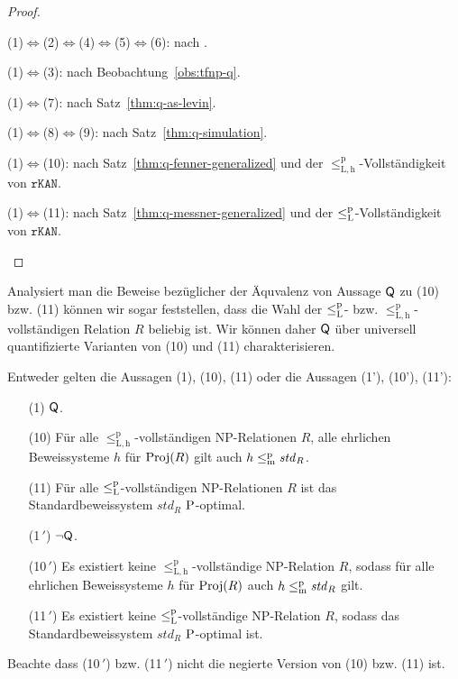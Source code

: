 \begin{proof}
\begin{prooflist}[nosep,label={\arabic*.},labelsep=3pt]
\item (1)$\iff$(2)$\iff$(4)$\iff$(5)$\iff$(6): nach \textcite[Thm.~2]{fenner_inverting_2003}. 

\item (1)$\iff$(3): nach Beobachtung~\ref{obs:tfnp-q}.

\item (1)$\iff$(7): nach Satz~\ref{thm:q-as-levin}.

\item (1)$\iff$(8)$\iff$(9): nach Satz~\ref{thm:q-simulation}.

\item (1)$\iff$(10): nach Satz~\ref{thm:q-fenner-generalized} und der $\leq_\mathrm{L,h}^\mathrm p$-Vollständigkeit von $\mathtt{rKAN}$.

\item (1)$\iff$(11): nach Satz~\ref{thm:q-messner-generalized} und der $\leqlp$-Vollständigkeit von $\mathtt{rKAN}$.
\end{prooflist}
\end{proof}

Analysiert man die Beweise bezüglicher der Äquvalenz von Aussage $\hQ$ zu (10) bzw. (11) können wir sogar feststellen, dass die Wahl der $\leqlp$- bzw. $\leq_\mathrm{L,h}^\mathrm p$-vollständigen Relation $R$ beliebig ist. 
Wir können daher $\hQ$ über universell quantifizierte Varianten von (10) und (11) charakterisieren. 
\begin{theorem}
    Entweder gelten die Aussagen (1), (10), (11) oder die Aussagen (1'), (10'),  (11'):
    \begin{enumerate}
        \item[(1)] $\hQ$.
        \item[(10)] Für alle $\leq_\mathrm{L,h}^\mathrm p$-vollständigen NP-Relationen $R$, alle ehrlichen Beweissysteme $h$ für $\Proj(R)$ gilt auch $h\leqmp\mathit{std}_R$.
        \item[(11)] Für alle $\leqlp$-vollständigen NP-Relationen $R$ ist das Standardbeweissystem $\mathit{std}_R$ $\P$-optimal.
        \item[(1$\,'$)] $\neg\hQ$.
        \item[(10$\,'$)] Es existiert keine $\leq_\mathrm{L,h}^\mathrm p$-vollständige NP-Relation $R$, sodass für alle ehrlichen Beweissysteme $h$ für $\Proj(R)$ auch $h\leqmp \mathit{std}_R$ gilt.
        \item[(11$\,'$)] Es existiert keine $\leqlp$-vollständige NP-Relation $R$, sodass das Standardbeweissystem $\mathit{std}_R$ $\P$-optimal ist.
    \end{enumerate}
    Beachte dass (10$\,'$) bzw. (11$\,'$) nicht die negierte Version von (10) bzw. (11) ist.
\end{theorem}



